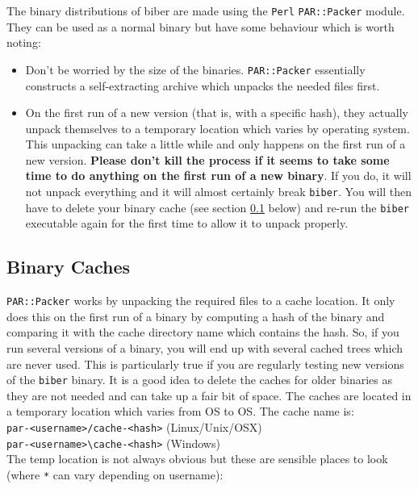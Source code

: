 \documentclass{ltxdockit}
\begin{document}
The binary distributions of biber are made using the \verb+Perl+ \verb+PAR::Packer+
module. They can be used as a normal binary but have some behaviour which
is worth noting:

\begin{itemize}
\item Don't be worried by the size of the binaries. \verb+PAR::Packer+ essentially
  constructs a self-extracting archive which unpacks the needed files first.
\item On the first run of a new version (that is, with a specific hash),
  they actually unpack themselves to a temporary location which varies by
  operating system. This unpacking can take a little while and only happens
  on the first run of a new version. \textbf{Please don't kill the process
    if it seems to take some time to do anything on the first run of a new
    binary}. If you do, it will not unpack everything and it will almost
  certainly break \verb+biber+. You will then have to delete your binary
  cache (see section \ref{bc} below) and re-run the \verb+biber+ executable
  again for the first time to allow it to unpack properly.
\end{itemize}

\subsection{Binary Caches}\label{bc}

\verb+PAR::Packer+ works by unpacking the required files to a cache
location. It only does this on the first run of a binary 
by computing a hash of the binary and comparing it with
the cache directory name which contains the hash. So, if you run
several versions of a binary, you will end up with several cached
trees which are never used. This is particularly true if you are regularly
testing new versions of the \verb+biber+ binary. It is a good idea to
delete the caches for older binaries as they are not needed and can take up
a fair bit of space. The caches are located in a temporary location which
varies from OS to OS. The cache name is:\\[1ex]

\noindent\verb+par-<username>/cache-<hash>+ (Linux/Unix/OSX)\\
\verb+par-<username>\cache-<hash>+ (Windows)\\[1ex]

\noindent The temp location is not always obvious but these are sensible
places to look (where \verb+*+ can vary depending on username):
\end{document}
